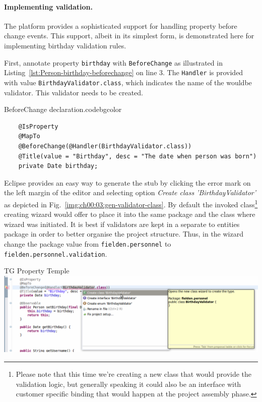   \paragraph*{Implementing validation.}
  The platform provides a sophisticated support for handling property before change events.
  This support, albeit in its simplest form, is demonstrated here for implementing birthday validation rules.

  First, annotate property \texttt{birthday} with \texttt{BeforeChange} as illustrated in Listing~\ref{lst:Person-birthday-beforechange} on line 3.
  The \texttt{Handler} is provided with value \texttt{BirthdayValidator.class}, which indicates the name of the wouldbe validator.
  This validator needs to be created.

  \begin{code}{BeforeChange declaration.}{\label{lst:Person-birthday-beforechange}}{codebgcolor}
    \begin{lstlisting}
    @IsProperty
    @MapTo
    @BeforeChange(@Handler(BirthdayValidator.class))
    @Title(value = "Birthday", desc = "The date when person was born")
    private Date birthday;
    \end{lstlisting}
  \end{code}

  Eclipse provides an easy way to generate the stub by clicking the error mark on the left margin of the editor and selecting option \emph{Create class 'BirthdayValidator'} as depicted in Fig.~\ref{img:ch00:03:gen-validator-class}.
  By default the invoked class\footnote{Please note that this time we're creating a new class that would provide the validation logic, but generally speaking it could also be an interface with customer specific binding that would happen at the project assembly phase.} creating wizard would offer to place it into the same package and the class where wizard was initiated.
  It is best if validators are kept in a separate to entities package in order to better organise the project structure.
  Thus, in the wizard change the package value from \texttt{fielden.personnel} to \texttt{fielden.personnel.validation}.

  \begin{image}{TG Property Temple}{\label{img:ch00:03:gen-validator-class}}
    \includegraphics[width=\textwidth]{parts/00-part/chapters/02-making-changes/images/04-create-validator.png}
  \end{image}

